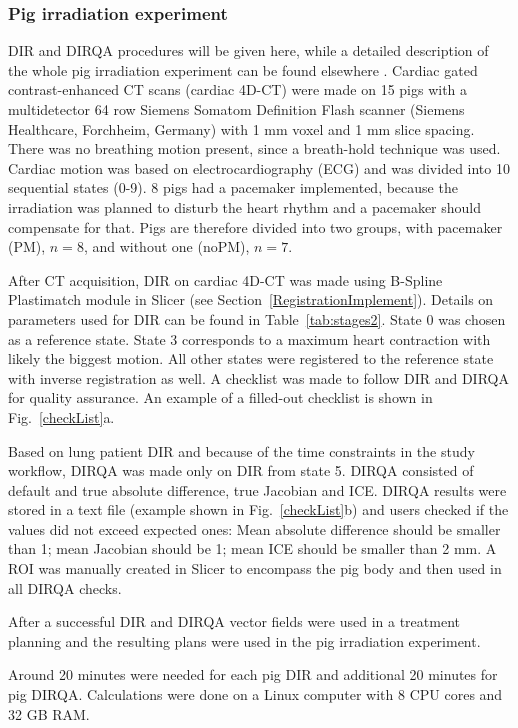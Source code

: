 \documentclass[type=dr, dr=rernat, accentcolor=tud7b,colorbacktitle, bigchapter, openright, twoside, 12pt ]{tudthesis}
\begin{document}
\subsubsection{Pig irradiation experiment}

DIR and DIRQA procedures will be given here, while a detailed description of the whole pig irradiation experiment can be found elsewhere \cite{Lehmann2015}. Cardiac gated contrast-enhanced CT scans (cardiac 4D-CT) were made on 15 pigs with a multidetector 64 row Siemens Somatom Definition Flash scanner 
(Siemens Healthcare, Forchheim, Germany) with 1 mm voxel and 1 mm slice spacing. There was no breathing motion present, since a breath-hold technique was used. Cardiac motion was based on electrocardiography (ECG)
and was divided into 10 sequential states (0-9). 
8 pigs had a pacemaker implemented, because the irradiation was planned to disturb the heart rhythm and a pacemaker should compensate for that. Pigs are therefore divided into two groups, with pacemaker (PM), $n=8$, and without one (noPM), $n=7$.

After CT acquisition, DIR on cardiac 4D-CT was made using B-Spline Plastimatch module in Slicer (see Section~\ref{RegistrationImplement}). 
Details on parameters used for DIR can be found in Table~\ref{tab:stages2}. State 0 was chosen as a reference state. State 3 corresponds to a maximum heart contraction with likely
the biggest motion. All other states were registered to the reference state with inverse registration as well. 
A checklist was made to follow DIR and DIRQA for quality assurance. An example of a filled-out checklist is shown in Fig.~\ref{checkList}a.

Based on lung patient DIR and because of the time constraints in the study workflow, DIRQA was made only on DIR from state 5. 
DIRQA consisted of default and true absolute difference, true Jacobian and ICE. DIRQA results were stored in a text file (example shown in Fig.~\ref{checkList}b) and users checked if the values did not exceed expected ones: Mean absolute difference
should be smaller than 1; mean Jacobian  should be 1; mean ICE  should be smaller than 2 mm. A ROI was manually created in Slicer to encompass the pig body and then used in all DIRQA checks.

After a successful DIR and DIRQA vector fields were used in a treatment planning and the resulting plans were used in the pig irradiation experiment.

Around 20 minutes were needed for each pig DIR and additional 20 minutes for pig DIRQA. Calculations were done on a Linux computer with 8 CPU cores and 32 GB RAM.
\end{document}
